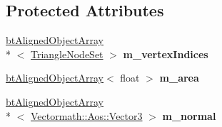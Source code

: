 \subsection*{Protected Attributes}
\begin{DoxyCompactItemize}
\item 
\hypertarget{classbt_soft_body_triangle_data_a57d01a84ab5f7d3b4bafb674dec2dd60}{\hyperlink{classbt_aligned_object_array}{bt\+Aligned\+Object\+Array}\\*
$<$ \hyperlink{classbt_soft_body_triangle_data_1_1_triangle_node_set}{Triangle\+Node\+Set} $>$ {\bfseries m\+\_\+vertex\+Indices}}\label{classbt_soft_body_triangle_data_a57d01a84ab5f7d3b4bafb674dec2dd60}

\item 
\hypertarget{classbt_soft_body_triangle_data_abeaa6783f7b46fe9acf02913a89e024f}{\hyperlink{classbt_aligned_object_array}{bt\+Aligned\+Object\+Array}$<$ float $>$ {\bfseries m\+\_\+area}}\label{classbt_soft_body_triangle_data_abeaa6783f7b46fe9acf02913a89e024f}

\item 
\hypertarget{classbt_soft_body_triangle_data_ab902e3586ddebe5f7b241d5c36df0e41}{\hyperlink{classbt_aligned_object_array}{bt\+Aligned\+Object\+Array}\\*
$<$ \hyperlink{class_vectormath_1_1_aos_1_1_vector3}{Vectormath\+::\+Aos\+::\+Vector3} $>$ {\bfseries m\+\_\+normal}}\label{classbt_soft_body_triangle_data_ab902e3586ddebe5f7b241d5c36df0e41}

\end{DoxyCompactItemize}


